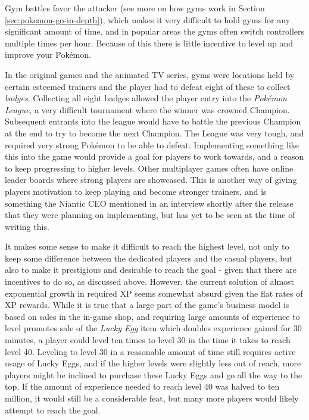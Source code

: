 Gym battles favor the attacker (see more on how gyms work in Section \ref{sec:pokemon-go-in-depth}), which makes it very difficult to hold gyms for any significant amount of time, and in popular areas the gyms often switch controllers multiple times per hour. Because of this there is little incentive to level up and improve your Pokémon.

In the original games and the animated TV series, gyms were locations held by certain esteemed trainers and the player had to defeat eight of these to collect \emph{badges}. Collecting all eight badges allowed the player entry into the \emph{Pokémon League}, a very difficult tournament where the winner was crowned Champion. Subsequent entrants into the league would have to battle the previous Champion at the end to try to become the next Champion. The League was very tough, and required very strong Pokémon to be able to defeat. Implementing something like this into the game would provide a goal for players to work towards, and a reason to keep progressing to higher levels. Other multiplayer games often have online leader boards where strong players are showcased. This is another way of giving players motivation to keep playing and become stronger trainers, and is something the Niantic CEO mentioned in an interview shortly after the release  that they were planning on implementing, but has yet to be seen at the time of writing this.

It makes some sense to make it difficult to reach the highest level, not only to keep some difference between the dedicated players and the casual players, but also to make it prestigious and desirable to reach the goal - given that there are incentives to do so, as discussed above. However, the current solution of almost exponential growth in required XP seems somewhat absurd given the flat rates of XP rewards. While it is true that a large part of the game's business model is based on sales in the in-game shop, and requiring large amounts of experience to level promotes sale of the \emph{Lucky Egg} item which doubles experience  gained for 30 minutes, a player could level ten times to level 30 in the time it takes to reach level 40. Leveling to level 30 in a reasonable amount of time still requires active usage of Lucky Eggs, and if the higher levels were slightly less out of reach, more players might be inclined to purchase these Lucky Eggs and go all the way to the top. If the amount of experience needed to reach level 40 was halved to ten million, it would still be a considerable feat, but many more players would likely attempt to reach the goal.


